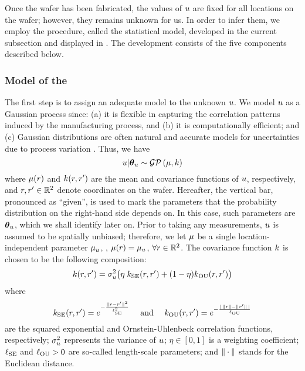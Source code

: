 Once the wafer has been fabricated, the values of $u$ are fixed for all locations on the wafer; however, they remains unknown for us.
In order to infer them, we employ the procedure, called the statistical model, developed in the current subsection and displayed in .
The development consists of the five components described below.

\subsubsection{Model of the \qoi}
The first step is to assign an adequate model to the unknown $u$.
We model $u$ as a Gaussian process \cite{rasmussen2006} since: (a) it is flexible in capturing the correlation patterns induced by the manufacturing process, and (b) it is computationally efficient; and (c) Gaussian distributions are often natural and accurate models for uncertainties due to process variation \cite{srivastava2010, juan2012}. Thus, we have
\begin{equation} \elabel{u-prior}
  \u | \vparam_\u \sim \gaussianp{\fMean}{\fCov}
\end{equation}
where $\fMean(\r)$ and $\fCov(\r, \r')$ are the mean and covariance functions of $u$, respectively, and $r, r' \in \mathbb{R}^2$ denote coordinates on the wafer.
Hereafter, the vertical bar, pronounced as ``given'', is used to mark the parameters that the probability distribution on the right-hand side depends on. In this case, such parameters are ${\boldsymbol\theta}_u$, which we shall identify later on.
Prior to taking any measurements, $u$ is assumed to be spatially unbiased; therefore, we let $\fMean$ be a single location-independent parameter $\mu_u$, \ie, $\fMean{r} = \mu_\u$, $\forall r \in \mathbb{R}^2$.
The covariance function $\fCov$ is chosen to be the following composition:
\begin{equation} \elabel{covariance-function}
  \fCov{\r, \r'} = \sigma_\u^2 \big( \eta \; \fCov_\SE(\r, \r') + (1 - \eta) \fCov_\OU(\r, \r') \big)
\end{equation}
where
\[
  \fCov_\SE(\r, \r') = e^{-\frac{\norm{\r - \r'}^2}{\ell_\SE^2}} \hspace{1em} \text{ and } \hspace{1em}
  \fCov_\OU(\r, \r') = e^{- \frac{\abs{\,\norm{\r} - \norm{\r'}\,}}{\ell_\OU}}
\]
are the squared exponential and Ornstein-Uhlenbeck correlation functions, respectively; $\sigma_u^2$ represents the variance of $u$; $\eta \in [0, 1]$ is a weighting coefficient; $\ell_{\text{SE}}$ and $\ell_{\text{OU}} > 0$ are so-called length-scale parameters; and $\| \cdot \|$ stands for the Euclidean distance.
